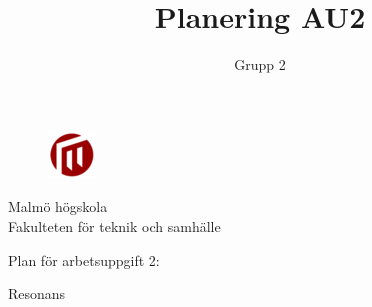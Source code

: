 \documentclass[12pt, a4paper]{report}
\author{Grupp 2}
\title{Planering AU2}
\begin{document}
\begin{figure}[t]

\includegraphics[scale=1]{mah}
\end{figure}

\begin{flushleft}
Malmö högskola\\
Fakulteten för teknik och samhälle
\end{flushleft}


\begin{center}
\begin{Huge}

Plan för arbetsuppgift 2:

\end{Huge}
\begin{LARGE}

Resonans

\end{LARGE}
\end{center}
\end{document}
